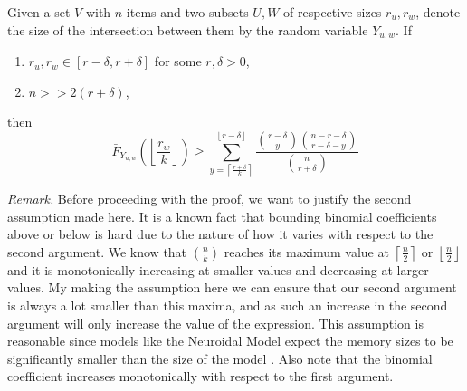 \begin{lemma}
    \label{lemma:expected-k-int-prob}
    Given a set $V$ with $n$ items and two subsets $U,W$ of respective sizes $r_u,r_w$, denote the size of the intersection between them by the random variable $Y_{u,w}$.
        If \begin{enumerate}
            \item $r_u, r_w \in [r-\delta, r+\delta]$ for some $r, \delta > 0$,
            \item $n >> 2(r+\delta)$, 
        \end{enumerate}      
then $$ \bar{F}_{Y_{u,w}}\left(\left\lfloor \frac{r_w}{k} 
\right\rfloor\right) \ge \sum_{y = \left\lceil \frac{r+\delta}{k} \right\rceil}^{\left\lfloor r - \delta \right\rfloor} \frac{\binom{r-\delta}{y} \binom{n-r-\delta}{r-\delta-y}}{\binom{n}{r+\delta}}$$
    \end{lemma}
    \textit{Remark.} Before proceeding with the proof, we want to justify the second assumption made here. It is a known fact that bounding binomial coefficients above or below is hard due to the nature of how it varies with respect to the second argument. We know that $n \choose k$ reaches its maximum value at $\left\lceil \frac{n}{2} \right\rceil$ or $\left\lfloor \frac{n}{2} \right\rfloor$ and it is monotonically increasing at smaller values and decreasing at larger values. My making the assumption here we can ensure that our second argument is always a lot smaller than this maxima, and as such an increase in the second argument will only increase the value of the expression. This assumption is reasonable since models like the Neuroidal Model expect the memory sizes to be significantly smaller than the size of the model \cite{valiant2005memorization}. Also note that the binomial coefficient increases monotonically with respect to the first argument. 
